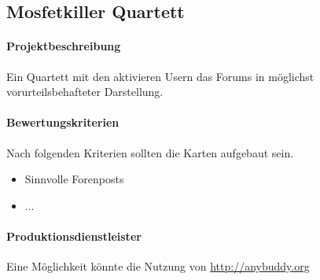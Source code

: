 \subsection{Mosfetkiller Quartett}
\paragraph{Projektbeschreibung} Ein Quartett mit den aktivieren Usern das Forums in möglichst vorurteilsbehafteter Darstellung. 
\paragraph{Bewertungskriterien} Nach folgenden Kriterien sollten die Karten aufgebaut sein.
\begin{itemize}
	\item Sinnvolle Forenposts
	\item ...
\end{itemize}

\paragraph{Produktionsdienstleister} Eine Möglichkeit könnte die Nutzung von \url{http://anybuddy.org}
